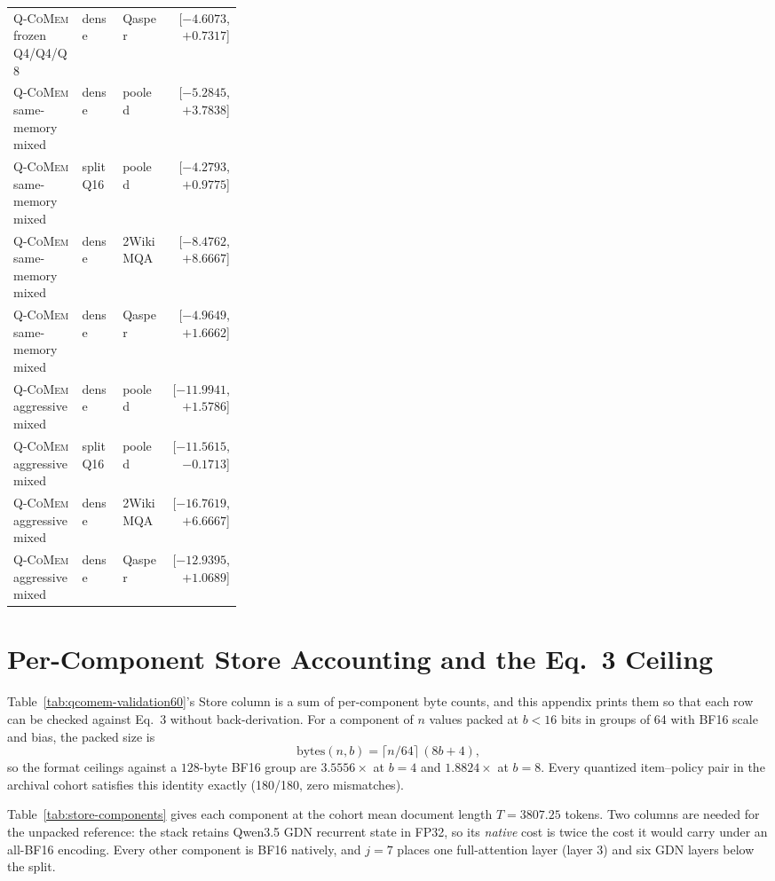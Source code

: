 \documentclass{article}
\newcommand{\qcomem}{\textsc{Q-CoMem}}
\begin{document}
\begin{longtable}{@{}>{\raggedright\arraybackslash}p{0.30\linewidth}llr@{}}
  \qcomem{} frozen Q4/Q4/Q8 & dense & Qasper & [$-4.6073$, $+0.7317$] \\
  \qcomem{} same-memory mixed & dense & pooled & [$-5.2845$, $+3.7838$] \\
  \qcomem{} same-memory mixed & split Q16 & pooled & [$-4.2793$, $+0.9775$] \\
  \qcomem{} same-memory mixed & dense & 2WikiMQA & [$-8.4762$, $+8.6667$] \\
  \qcomem{} same-memory mixed & dense & Qasper & [$-4.9649$, $+1.6662$] \\
  \qcomem{} aggressive mixed & dense & pooled & [$-11.9941$, $+1.5786$] \\
  \qcomem{} aggressive mixed & split Q16 & pooled & [$-11.5615$, $-0.1713$] \\
  \qcomem{} aggressive mixed & dense & 2WikiMQA & [$-16.7619$, $+6.6667$] \\
  \qcomem{} aggressive mixed & dense & Qasper & [$-12.9395$, $+1.0689$] \\
\end{longtable}
\endgroup

\section{Per-Component Store Accounting and the Eq.~3 Ceiling}
\label{app:store-components}

Table~\ref{tab:qcomem-validation60}'s Store column is a sum of per-component
byte counts, and this appendix prints them so that each row can be checked
against Eq.~3 without back-derivation.  For a component of $n$ values packed at
$b<16$ bits in groups of 64 with BF16 scale and bias, the packed size is
\begin{equation*}
  \mathrm{bytes}(n,b)=\lceil n/64\rceil\,(8b+4),
\end{equation*}
so the format ceilings against a $128$-byte BF16 group are $3.5556\times$ at
$b=4$ and $1.8824\times$ at $b=8$.  Every quantized item--policy pair in the
archival cohort satisfies this identity exactly (180/180, zero mismatches).

Table~\ref{tab:store-components} gives each component at the cohort mean
document length $T=3807.25$ tokens.  Two columns are needed for the unpacked
reference: the stack retains Qwen3.5 GDN recurrent state in FP32, so its
\emph{native} cost is twice the cost it would carry under an all-BF16 encoding.
Every other component is BF16 natively, and $j=7$ places one full-attention
layer (layer 3) and six GDN layers below the split.
\end{document}
